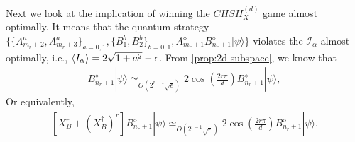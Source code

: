 \documentclass[11pt,letterpaper]{article}
\newcommand{\ket}[1]{|#1\rangle}
\newcommand{\ct}{^{\dagger}}
\DeclarePairedDelimiter{\ip}{\langle}{\rangle}
\newcommand{\1}{\mathbb{1}}
\newcommand{\CHSH}{CHSH^{(d)}}
\newcommand{\I}{\mathcal{I}}
\newcommand{\appd}[1]{\simeq_{#1}}
\theoremstyle{definition}
\begin{document}
Next we look at the implication of winning the $\CHSH_{X}$ game almost optimally.
It means that the quantum strategy $\{ \{A_{m_r+2}^a, A_{m_r+3}^a\}_{a=0,1},\{B_1^b,  B_2^b\}_{b=0,1}, A_{m_r+1}^\diamond B_{n_r+1}^\diamond \ket{\psi}\}$ violates the $\I_\alpha$ almost optimally, i.e., $\ip{I_\alpha} = 2\sqrt{1+a^2}-\epsilon$. 
From \cref{prop:2d-subspace}, we know that 
\begin{align}
	[(B_1B_2)^r + (B_2B_1)^r] B_{n_r+1}^\diamond \ket{\psi} \appd{O(2^{r-1}\sqrt{\epsilon})} 
	2\cos(\frac{2r\pi}{d}) B_{n_r+1}^\diamond \ket{\psi},
\end{align}
Or equivalently,
\begin{align}
\label{eq:b_to_cos}
	[X_B^r + (X_B\ct)^r] B_{n_r+1}^\diamond \ket{\psi} \appd{O(2^{r-1}\sqrt{\epsilon})} 
	2\cos(\frac{2r\pi}{d}) B_{n_r+1}^\diamond \ket{\psi}.
\end{align}
\end{document}
